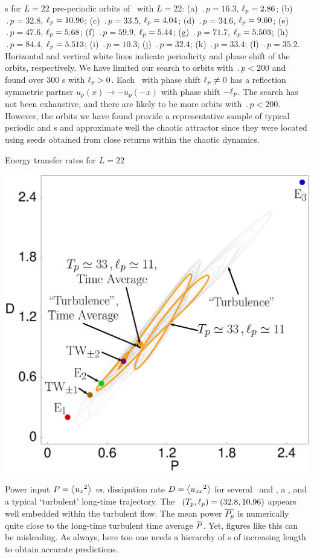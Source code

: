 \documentclass{theo1poster}[2003/04/25]
\begin{document}
\begin{poster}{3}
\begin{sheet}{\Rpo s for $L=22$}
pre-periodic
orbits of \KSe\ with $L = 22$:
(a) $\period{p} = 16.3$, $\ell_p = 2.86$;
(b) $\period{p} = 32.8$, $\ell_p = 10.96$;
(c) $\period{p} = 33.5$, $\ell_p = 4.04$;
(d) $\period{p} = 34.6$, $\ell_p = 9.60$;
(e) $\period{p} = 47.6$, $\ell_p = 5.68$;
(f) $\period{p} = 59.9$, $\ell_p = 5.44$;
(g) $\period{p} = 71.7$, $\ell_p = 5.503$;
(h) $\period{p} = 84.4$, $\ell_p = 5.513$;
(i) $\period{p} = 10.3$;
(j) $\period{p} = 32.4$;
(k) $\period{p} = 33.4$;
(l) $\period{p} = 35.2$.
Horizontal and vertical white lines indicate periodicity and phase
shift of the orbits, respectively. We have limited our search to orbits with $\period{p} < 200$ and found
over 300 \rpo s with $\ell_p > 0$.
Each \rpo\ with phase shift
$\ell_p \neq 0$ has a reflection symmetric partner
$u_p(x) \to -u_p(-x)$ with phase shift $-\ell_p$. 
The search has not been exhaustive, and there are likely to be more
orbits with $\period{p} < 200$. However, the orbits we have found provide a representative sample of
typical periodic and \rpo s and approximate well the chaotic
attractor since they were located using seeds obtained from close
returns within the chaotic dynamics.


\end{sheet}


\begin{sheet}{Energy transfer rates for $L=22$}

\centerline{\includegraphics[width=.4\textwidth]{../../figs/energyBalance_pst.eps}}
Power input $P = \left\langle {u_{x}{}^2} \right\rangle$ {\em vs.}
dissipation rate  $D =  \left\langle {u_{xx}{}^2} \right\rangle$
for several  \eqva\ and \reqva,
a \rpo , and a typical `turbulent' long-time trajectory.
The \rpo\ $({T_{p}},\ell_p) = (32.8,10.96)$ appears well embedded
within the turbulent flow. The mean power $\overline{P_p}$ 
is numerically quite close to the long-time
turbulent time average $\overline{P}$.
Yet, figures like this can be misleading. As always, here too one needs a hierarchy
of \po s of increasing length to obtain accurate
predictions.



\end{sheet}
\end{poster}
\end{document}
